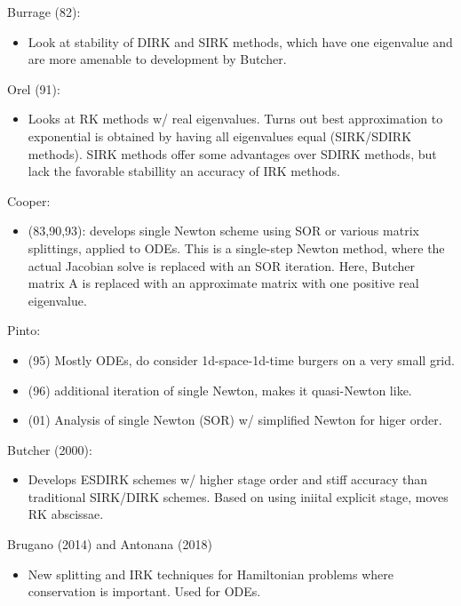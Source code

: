 \documentclass[a4paper,10pt]{article}
\begin{document}
Burrage (82):
\begin{itemize}
	\item Look at stability of DIRK and SIRK methods, which have one eigenvalue and are more amenable
	to development by Butcher. 
\end{itemize}

Orel (91):
\begin{itemize}
	\item Looks at RK methods w/ real eigenvalues. Turns out best approximation to exponential is
	obtained by having all eigenvalues equal (SIRK/SDIRK methods). SIRK methods offer some advantages over SDIRK methods, but lack the favorable stabillity an accuracy of IRK methods. 
\end{itemize}

Cooper:
\begin{itemize}
	\item (83,90,93): develops single Newton scheme using SOR or various matrix splittings,
	applied to ODEs. This is a single-step
	Newton method, where the actual Jacobian solve is replaced with an SOR iteration. Here, Butcher
	matrix A is replaced with an approximate matrix with one positive real eigenvalue. 
\end{itemize}

Pinto:
\begin{itemize}
	\item (95) Mostly ODEs, do consider 1d-space-1d-time burgers on a very small grid. 
	\item (96) additional iteration of single Newton, makes it quasi-Newton like. 
	\item (01) Analysis of single Newton (SOR) w/ simplified Newton for higer order. 
\end{itemize}


Butcher (2000):
\begin{itemize}
	\item Develops ESDIRK schemes w/ higher stage order and stiff accuracy than traditional
	SIRK/DIRK schemes. Based on using iniital explicit stage, moves RK abscissae.
\end{itemize}


Brugano (2014) and Antonana (2018)
\begin{itemize}
	\item New splitting and IRK techniques for Hamiltonian problems where conservation is
	important. Used for ODEs. 
\end{itemize}


\end{document}
